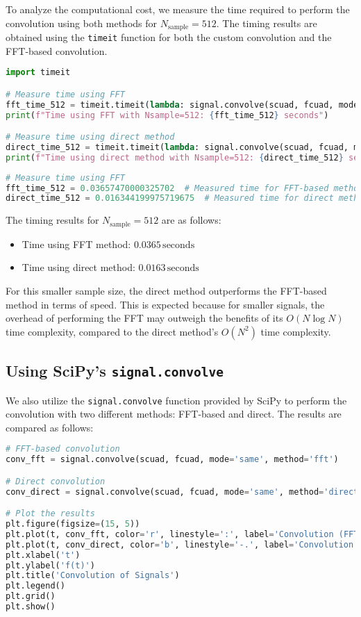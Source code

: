 \documentclass[10pt]{article}
\theoremstyle{definition}
\theoremstyle{remark}
\theoremstyle{definition}
\numberwithin{equation}{prob}
\begin{document}
To analyze the computational cost, we measure the time required to perform the convolution using both methods for \(N_{\text{sample}} = 512\). The timing results are obtained using the \texttt{timeit} function for both the custom convolution and the FFT-based convolution.

\begin{lstlisting}[language=Python]
import timeit

# Measure time using FFT
fft_time_512 = timeit.timeit(lambda: signal.convolve(scuad, fcuad, mode='same', method='fft'), number=500)
print(f"Time using FFT with Nsample=512: {fft_time_512} seconds")

# Measure time using direct method
direct_time_512 = timeit.timeit(lambda: signal.convolve(scuad, fcuad, mode='same', method='direct'), number=500)
print(f"Time using direct method with Nsample=512: {direct_time_512} seconds")
\end{lstlisting}

\begin{lstlisting}[language=Python]
# Measure time using FFT
fft_time_512 = 0.03657470000325702  # Measured time for FFT-based method
direct_time_512 = 0.016344199975719675  # Measured time for direct method
\end{lstlisting}

The timing results for \(N_{\text{sample}} = 512\) are as follows:
\begin{itemize}
    \item Time using FFT method: \(0.0365 \, \text{seconds}\)
    \item Time using direct method: \(0.0163 \, \text{seconds}\)
\end{itemize}
For this smaller sample size, the direct method outperforms the FFT-based method in terms of speed. This is expected because for smaller signals, the overhead of performing the FFT may outweigh the benefits of its \(O(N \log N)\) time complexity, compared to the direct method's \(O(N^2)\) time complexity.


\subsection{Using SciPy's \texttt{signal.convolve}}

We also utilize the \texttt{signal.convolve} function provided by SciPy to perform the convolution with two different methods: FFT-based and direct. The results are compared as follows:

\begin{lstlisting}[language=Python]
# FFT-based convolution
conv_fft = signal.convolve(scuad, fcuad, mode='same', method='fft')

# Direct convolution
conv_direct = signal.convolve(scuad, fcuad, mode='same', method='direct')

# Plot the results
plt.figure(figsize=(15, 5))
plt.plot(t, conv_fft, color='r', linestyle=':', label='Convolution (FFT)')
plt.plot(t, conv_direct, color='b', linestyle='-.', label='Convolution (Direct)')
plt.xlabel('t')
plt.ylabel('f(t)')
plt.title('Convolution of Signals')
plt.legend()
plt.grid()
plt.show()
\end{lstlisting}
\end{document}

